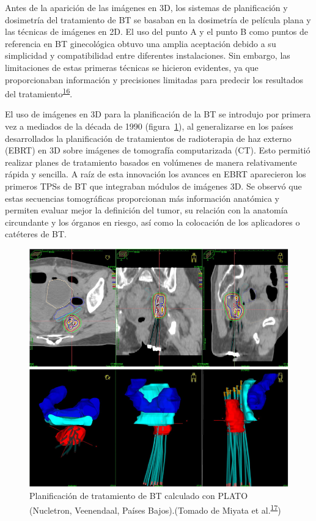 \documentclass[
  a4paper,
]{scrreprt}
\begin{document}
Antes de la aparición de las imágenes en 3D, los sistemas de
planificación y dosimetría del tratamiento de BT se basaban en la
dosimetría de película plana y las técnicas de imágenes en 2D. El uso
del punto A y el punto B como puntos de referencia en BT ginecológica
obtuvo una amplia aceptación debido a su simplicidad y compatibilidad
entre diferentes instalaciones. Sin embargo, las limitaciones de estas
primeras técnicas se hicieron evidentes, ya que proporcionaban
información y precisiones limitadas para predecir los resultados del
tratamiento\textsuperscript{\protect\hyperlink{ref-puxf6tter2001}{16}}.

El uso de imágenes en 3D para la planificación de la BT se introdujo por
primera vez a mediados de la década de 1990 (figura~\ref{fig-plato}), al
generalizarse en los países desarrollados la planificación de
tratamientos de radioterapia de haz externo (EBRT) en 3D sobre imágenes
de tomografía computarizada (CT). Esto permitió realizar planes de
tratamiento basados en volúmenes de manera relativamente rápida y
sencilla. A raíz de esta innovación los avances en EBRT aparecieron los
primeros TPSs de BT que integraban módulos de imágenes 3D. Se observó
que estas secuencias tomográficas proporcionan más información anatómica
y permiten evaluar mejor la definición del tumor, su relación con la
anatomía circundante y los órganos en riesgo, así como la colocación de
los aplicadores o catéteres de BT.

\begin{figure}

{\centering \includegraphics{img/Plato.png}

}

\caption{\label{fig-plato}Planificación de tratamiento de BT calculado
con PLATO (Nucletron, Veenendaal, Países Bajos).(Tomado de Miyata et
al.\textsuperscript{\protect\hyperlink{ref-miyata2023}{17}})}

\end{figure}
\end{document}
